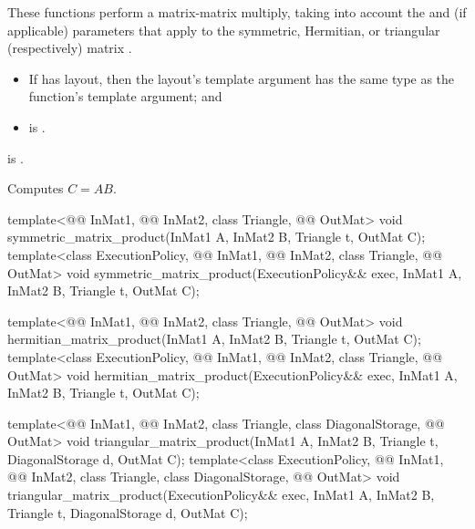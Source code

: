 \begin{itemdescr}
\pnum
These functions perform a matrix-matrix multiply,
taking into account
the  and  (if applicable) parameters
that apply to the symmetric, Hermitian, or triangular (respectively) matrix .

\pnum
\mandates
\begin{itemize}
\item
If  has  layout,
then the layout's  template argument has
the same type as the function's  template argument; and
\item
{} is .
\end{itemize}

\pnum
\expects
{} is .

\pnum
\effects
Computes $C = A B$.
\end{itemdescr}

\begin{itemdecl}
  template<@@ InMat1, @@ InMat2, class Triangle, @@ OutMat>
    void symmetric_matrix_product(InMat1 A, InMat2 B, Triangle t, OutMat C);
  template<class ExecutionPolicy,
           @@ InMat1, @@ InMat2, class Triangle, @@ OutMat>
    void symmetric_matrix_product(ExecutionPolicy&& exec,
                                  InMat1 A, InMat2 B, Triangle t, OutMat C);

  template<@@ InMat1, @@ InMat2, class Triangle, @@ OutMat>
    void hermitian_matrix_product(InMat1 A, InMat2 B, Triangle t, OutMat C);
  template<class ExecutionPolicy,
           @@ InMat1, @@ InMat2, class Triangle, @@ OutMat>
    void hermitian_matrix_product(ExecutionPolicy&& exec,
                                  InMat1 A, InMat2 B, Triangle t, OutMat C);

  template<@@ InMat1, @@ InMat2, class Triangle, class DiagonalStorage,
           @@ OutMat>
    void triangular_matrix_product(InMat1 A, InMat2 B, Triangle t, DiagonalStorage d, OutMat C);
  template<class ExecutionPolicy,
           @@ InMat1, @@ InMat2, class Triangle, class DiagonalStorage,
           @@ OutMat>
    void triangular_matrix_product(ExecutionPolicy&& exec,
                                   InMat1 A, InMat2 B, Triangle t, DiagonalStorage d, OutMat C);
\end{itemdecl}

